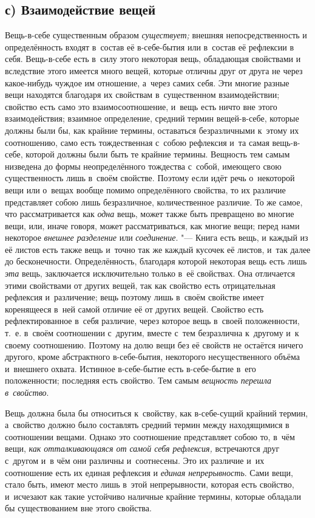\subsection[с) Взаимодействие вещей]{с) Взаимодействие вещей}
Вещь-в-себе существенным образом
{\em существует;} внешняя непосредственность и
определённость входят в~состав её в-себе-бытия или в~состав её рефлексии в
себя. Вещь-в-себе есть в~силу этого некоторая вещь, обладающая свойствами и
вследствие этого имеется много вещей, которые отличны друг от друга не
через какое-нибудь чуждое им отношение, а~через самих себя. Эти многие
разные вещи находятся благодаря их свойствам в~существенном взаимодействии;
свойство есть само это взаимосоотношение, и~вещь есть ничто вне этого
взаимодействия; взаимное определение, средний термин вещей-в-себе, которые
должны были бы, как крайние термины, оставаться безразличными к~этому их
соотношению, само есть тождественная с~собою рефлексия и~та самая
вещь-в-себе, которой должны были быть те крайние термины. Вещность тем
самым низведена до формы неопределённого тождества с~собой, имеющего свою
существенность лишь в~своём свойстве. Поэтому если идёт речь о~некоторой
вещи или о~вещах вообще помимо определённого свойства, то их различие
представляет собою лишь безразличное, количественное различие. То же самое,
что рассматривается как {\em одна} вещь, может также
быть превращено во многие вещи, или, иначе говоря, может рассматриваться,
как многие вещи; перед нами некоторое {\em внешнее
разделение} или {\em соединение}. "--- Книга есть вещь, и
каждый из её листов есть также вещь и~точно так же каждый кусочек её
листов, и~так далее до бесконечности. Определённость, благодаря которой
некоторая вещь есть лишь {\em эта} вещь, заключается
исключительно только в~её свойствах. Она отличается этими свойствами от
других вещей, так как свойство есть отрицательная рефлексия и~различение;
вещь поэтому лишь в~своём свойстве имеет коренящееся в~ней самой отличие её
от других вещей. Свойство есть рефлектированное в~себя различие, через
которое вещь в~своей положенности, т.~е. в~своём соотношении с~другим,
вместе с~тем безразлична к~другому и~к своему соотношению. Поэтому на долю
вещи без её свойств не остаётся ничего другого, кроме абстрактного
в-себе-бытия, некоторого несущественного объёма и~внешнего охвата. Истинное
в-себе-бытие есть в-себе-бытие в~его положенности; последняя есть свойство.
Тем самым {\em вещность перешла в~свойство}.

Вещь должна была бы относиться к~свойству, как в-себе-сущий крайний термин,
а~свойство должно было составлять средний термин между находящимися в
соотношении вещами. Однако это соотношение представляет собою то, в~чём
вещи, {\em как отталкивающаяся от самой себя
рефлексия,} встречаются друг с~другом и~в чём они различны и~соотнесены.
Это их различие и~их соотношение есть их единая рефлексия и
{\em единая непрерывность}. Сами вещи, стало быть,
имеют место лишь в~этой непрерывности, которая есть свойство, и~исчезают
как такие устойчиво наличные крайние термины, которые обладали бы
существованием вне этого свойства.

